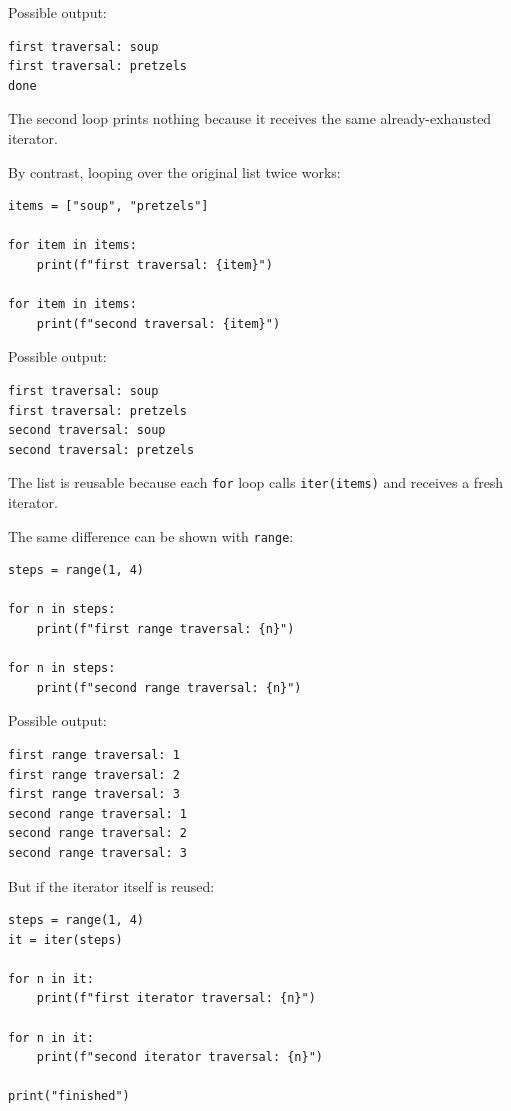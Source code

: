 Possible output:

\begin{verbatim}
first traversal: soup
first traversal: pretzels
done
\end{verbatim}

The second loop prints nothing because it receives the same already-exhausted iterator.

By contrast, looping over the original list twice works:

\begin{verbatim}
items = ["soup", "pretzels"]

for item in items:
    print(f"first traversal: {item}")

for item in items:
    print(f"second traversal: {item}")
\end{verbatim}

Possible output:

\begin{verbatim}
first traversal: soup
first traversal: pretzels
second traversal: soup
second traversal: pretzels
\end{verbatim}

The list is reusable because each \texttt{for} loop calls \texttt{iter(items)} and receives a fresh iterator.

The same difference can be shown with \texttt{range}:

\begin{verbatim}
steps = range(1, 4)

for n in steps:
    print(f"first range traversal: {n}")

for n in steps:
    print(f"second range traversal: {n}")
\end{verbatim}

Possible output:

\begin{verbatim}
first range traversal: 1
first range traversal: 2
first range traversal: 3
second range traversal: 1
second range traversal: 2
second range traversal: 3
\end{verbatim}

But if the iterator itself is reused:

\begin{verbatim}
steps = range(1, 4)
it = iter(steps)

for n in it:
    print(f"first iterator traversal: {n}")

for n in it:
    print(f"second iterator traversal: {n}")

print("finished")
\end{verbatim}

